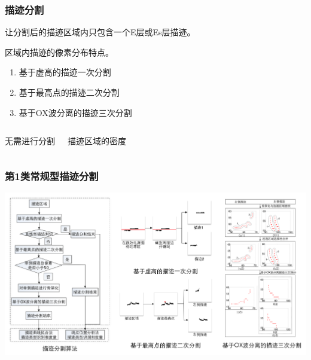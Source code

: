 \documentclass[notheorems,mathserif,table,compress]{beamer}  %
\begin{document}
\begin{frame}
\frametitle{ 描迹分割}
\begin{tcolorbox}[colback=blue!5,colframe=blue!75!black]
\begin{description}
\vspace{-0.5em}
\addtolength{\itemindent}{-4em}
\item[目的] 让分割后的描迹区域内只包含一个E层或Es层描迹。
\item[依据] 区域内描迹的像素分布特点。
\vspace{-0.5em}
\end{description}
\end{tcolorbox}
\begin{tcolorbox}[colback=blue!5,colframe=blue!75!black,title=第1类\ 常规型]
\begin{enumerate}
\item 基于虚高的描迹一次分割
\item 基于最高点的描迹二次分割
\item 基于OX波分离的描迹三次分割
\end{enumerate}
\end{tcolorbox}
\begin{columns}
\begin{tcolorbox}[colback=blue!5,colframe=blue!75!black,title=第2类\ 扩散型]
无需进行分割
\end{tcolorbox}
\begin{tcolorbox}[colback=blue!5,colframe=blue!75!black,title=第3类\ 混合型]
描迹区域的密度
\end{tcolorbox}
\end{columns}
\end{frame}


\begin{frame}
\frametitle{ 第1类\textbf{常规型}描迹分割}
\centering\includegraphics[width=\linewidth]{描迹分割结果.png} 
\end{frame}
\end{document}
